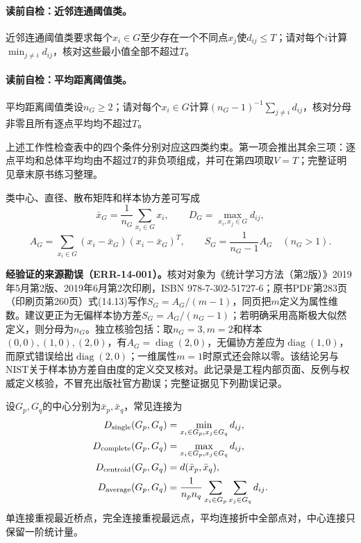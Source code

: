 \paragraph{读前自检：近邻连通阈值类。}近邻连通阈值类要求每个$x_i\in G$至少存在一个不同点$x_j$使$d_{ij}\le T$；请对每个$i$计算$\min_{j\ne i}d_{ij}$，核对这些最小值全部不超过$T$。\par
\paragraph{读前自检：平均距离阈值类。}平均距离阈值类设$n_G\ge2$；请对每个$x_i\in G$计算$(n_G-1)^{-1}\sum_{j\ne i}d_{ij}$，核对分母非零且所有逐点平均均不超过$T$。\par

上述工作性检查表中的四个条件分别对应这四类约束。第一项会推出其余三项：逐点平均和总体平均均由不超过$T$的非负项组成，并可在第四项取$V=T$；完整证明见章末原书练习整理。

类中心、直径、散布矩阵和样本协方差可写成
\[
\bar x_G=\frac1{n_G}\sum_{x_i\in G}x_i,\qquad
D_G=\max_{x_i,x_j\in G}d_{ij},
\]
\[
A_G=\sum_{x_i\in G}(x_i-\bar x_G)(x_i-\bar x_G)^T,\qquad
S_G=\frac1{n_G-1}A_G\quad(n_G>1).
\]
\begin{warningbox}
\textbf{经验证的来源勘误（ERR-14-001）。}核对对象为《统计学习方法（第2版）》2019年5月第2版、2019年6月第2次印刷，ISBN 978-7-302-51727-6；原书PDF第283页（印刷页第260页）式(14.13)写作$S_G=A_G/(m-1)$，同页把$m$定义为属性维数。建议更正为无偏样本协方差$S_G=A_G/(n_G-1)$；若明确采用高斯极大似然定义，则分母为$n_G$。独立核验包括：取$n_G=3,m=2$和样本$(0,0),(1,0),(2,0)$，有$A_G=\operatorname{diag}(2,0)$，无偏协方差应为$\operatorname{diag}(1,0)$，而原式错误给出$\operatorname{diag}(2,0)$；一维属性$m=1$时原式还会除以零。该结论另与NIST关于样本协方差自由度的定义交叉核对。此记录是工程内部页面、反例与权威定义核验，不冒充出版社官方勘误；完整证据见下列勘误记录。
\end{warningbox}

设$G_p,G_q$的中心分别为$\bar x_p,\bar x_q$，常见连接为
\[
\begin{aligned}
D_{\rm single}(G_p,G_q)&=\min_{x_i\in G_p,x_j\in G_q}d_{ij},\\
D_{\rm complete}(G_p,G_q)&=\max_{x_i\in G_p,x_j\in G_q}d_{ij},\\
D_{\rm centroid}(G_p,G_q)&=d(\bar x_p,\bar x_q),\\
D_{\rm average}(G_p,G_q)&=\frac1{n_pn_q}\sum_{x_i\in G_p}\sum_{x_j\in G_q}d_{ij}.
\end{aligned}
\]
单连接重视最近桥点，完全连接重视最远点，平均连接折中全部点对，中心连接只保留一阶统计量。

